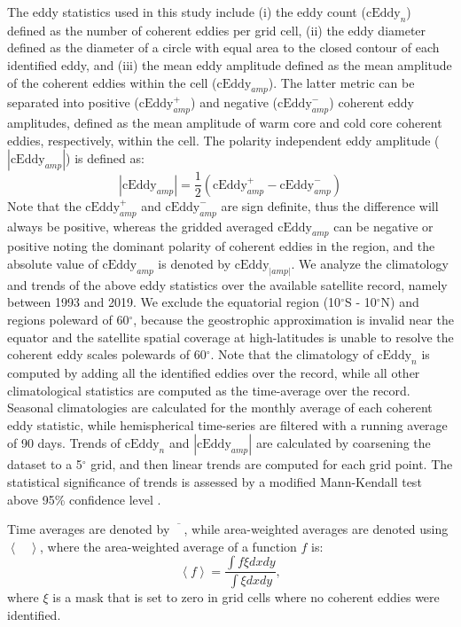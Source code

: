 \documentclass[draft,linenumbers]{agujournal2019}
\begin{document}
	The eddy statistics used in this study include (i) the eddy count ($\mathrm{cEddy}_{n}$) defined as the number of coherent eddies per grid cell, (ii) the eddy diameter defined as the diameter of a circle with equal area to the closed contour of each identified eddy, and (iii) the mean eddy amplitude defined as the mean amplitude of the coherent eddies within the cell ($\mathrm{cEddy}_{amp}$). The latter metric can be separated into positive ($\mathrm{cEddy}_{amp}^{+}$) and negative ($\mathrm{cEddy}_{amp}^{-}$) coherent eddy amplitudes, defined as the mean amplitude of warm core and cold core coherent eddies, respectively, within the cell. 
	The polarity independent eddy amplitude ($|\mathrm{cEddy}_{amp}|$) is defined as:
	\begin{equation}
	|\mathrm{cEddy}_{amp}| = \frac{1}{2} \left(\mathrm{cEddy}_{amp}^{+} -  \mathrm{cEddy}_{amp}^{-} \right)
	\end{equation}
	Note that the $\mathrm{cEddy}_{amp}^{+}$ and $\mathrm{cEddy}_{amp}^{-}$ are sign definite, thus the difference will always be positive, whereas the gridded averaged $\mathrm{cEddy}_{amp}$ can be negative or positive noting the dominant polarity of coherent eddies in the region, and the absolute value of $\mathrm{cEddy}_{amp}$ is denoted by $\mathrm{cEddy}_{|amp|}$.
	We analyze the climatology and trends of the above eddy statistics over the available satellite record, namely between 1993 and 2019. 
	We exclude the equatorial region (10$^\circ$S - 10$^\circ$N) and regions poleward of 60$^\circ$, because the geostrophic approximation is invalid near the equator and the satellite spatial coverage at high-latitudes is unable to resolve the coherent eddy scales polewards of 60$^\circ$.
	Note that the climatology of $\mathrm{cEddy}_{n}$ is computed by adding all the identified eddies over the record, while all other climatological statistics are computed as the time-average over the record.  
	Seasonal climatologies are calculated for the monthly average of each coherent eddy statistic, while hemispherical time-series are filtered with a running average of 90 days. 
	Trends of $\mathrm{cEddy}_{n}$ and $|\mathrm{cEddy}_{amp}|$ are calculated by coarsening the dataset to a 5$^\circ$ grid, and then linear trends are computed for each grid point. The statistical significance of trends is assessed by a modified Mann-Kendall test above 95\% confidence level \citep{Sheng_MK_2004}. 

	Time averages are denoted by $\overline{\phantom{X}}$, while area-weighted averages are denoted using $\left< \phantom{X}\right>$, where the area-weighted average of a function $f$ is:
	\begin{equation}
		\left< f \right>  = \frac{\int f \xi dx dy}{\int \xi dx dy},
	\end{equation}
	where $\xi$ is a mask that is set to zero in grid cells where no coherent eddies were identified. 
\end{document}
